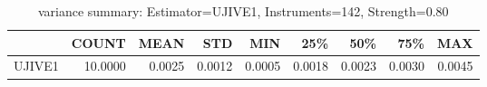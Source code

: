 \begin{table}[ht]
\centering
\caption{variance summary: Estimator=UJIVE1, Instruments=142, Strength=0.80}
\begin{tabular}{lrrrrrrrr}
\toprule
 & COUNT & MEAN & STD & MIN & 25\% & 50\% & 75\% & MAX \\
\midrule
UJIVE1 & 10.0000 & 0.0025 & 0.0012 & 0.0005 & 0.0018 & 0.0023 & 0.0030 & 0.0045 \\
\bottomrule
\end{tabular}
\end{table}
